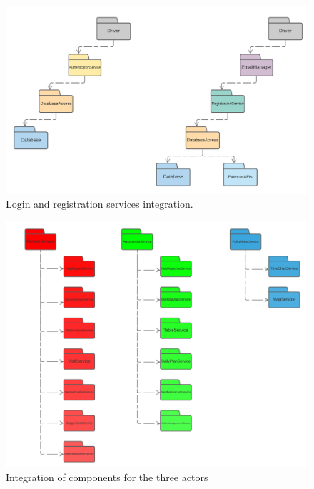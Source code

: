 \begin{center}
    \begin{figure}[h!]
  \includegraphics[width=\textwidth,height=\textheight,keepaspectratio]{./Images/IntegrationStrategy/IT2.png}
  \caption{Login and registration services integration.}
\end{figure}
\end{center}


\begin{center}
    \begin{figure}[h!]
  \includegraphics[width=\textwidth,height=\textheight,keepaspectratio]{./Images/IntegrationStrategy/IT3.png}
  \caption{Integration of components for the three actors}
\end{figure}
\end{center}



